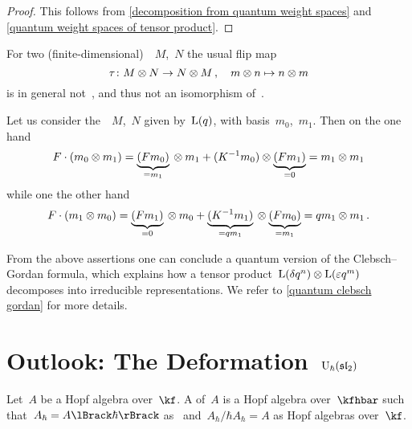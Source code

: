 \documentclass[a4paper, 11pt, oneside]{scrartcl}
\begin{document}
\begin{proof}
  This follows from \cref{decomposition from quantum weight spaces} and \cref{quantum weight spaces of tensor product}.
\end{proof}

\begin{warning}
  For two (finite-dimensional)~~$M$,~$N$ the usual flip map
  \[
    \tau
    \colon
    M \otimes N
    \to
    N \otimes M \,,
    \quad
    m \otimes n
    \mapsto
    n \otimes m
  \]
  is in general not~, and thus not an isomorphism of~.
\end{warning}

\begin{example}
  Let us consider the~~$M$,~$N$ given by~$\operatorname{L}(q)$, with basis~$m_0$,~$m_1$.
  Then on the one hand
  \[
    F \cdot (m_0 \otimes m_1)
    =
    \underbrace{ (F m_0) }_{= m_1} {} \otimes m_1
    +
    (K^{-1} m_0) \otimes \underbrace{(F m_1) }_{= 0}
    =
    m_1 \otimes m_1
  \]
  while one the other hand
  \[
    F \cdot (m_1 \otimes m_0)
    =
    \underbrace{ (F m_1) }_{= 0} {} \otimes m_0
    +
    \underbrace{ (K^{-1} m_1) }_{= q m_1} {} \otimes \underbrace{ (F m_0) }_{= m_1}
    =
    q m_1 \otimes m_1 \,.
  \]
\end{example}

From the above assertions one can conclude a quantum version of the Clebsch--Gordan formula, which explains how a tensor product~$\operatorname{L}(\delta q^n) \otimes \operatorname{L}(\varepsilon q^m)$ decomposes into irreducible representations.
We refer to \cref{quantum clebsch gordan} for more details.




\section{Outlook: The Deformation~\texorpdfstring{$\operatorname{U}_{\hbar}(\mathfrak{sl}_2)$}{Uh(sl2)}}

\begin{definition}
  Let~$A$ be a Hopf algebra over~$\kf$.
  A  of~$A$ is a Hopf algebra over~$\kfhbar$ such that~$A_\hbar = \power{A}{\hbar}$ as~\modules{$\kfhbar$} and~$A_\hbar / \hbar A_\hbar = A$ as Hopf algebras over~$\kf$.
\end{definition}
\end{document}
